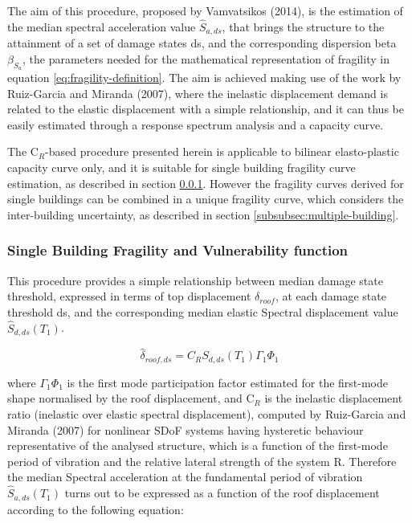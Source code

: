 The aim of this procedure, proposed by Vamvatsikos (2014), is the estimation of the median spectral acceleration value $\hat{S}_{a,ds}$, that brings the structure to the attainment of a set of damage states ds, and the corresponding dispersion beta $\beta_{S_a}$, the parameters needed for the mathematical representation of fragility in equation \ref{eq:fragility-definition}. The aim is achieved making use of the work by Ruiz-Garcia and Miranda (2007), where the inelastic displacement demand is related to the elastic displacement with a simple relationship, and it can thus be easily estimated through a response spectrum analysis and a capacity curve.

The C$_R$-based procedure presented herein is applicable to bilinear elasto-plastic capacity curve only, and it is suitable for single building fragility curve estimation, as described in section \ref{subsubsec:single-building}. However the fragility curves derived for single buildings can be combined in a unique fragility curve, which considers the inter-building uncertainty, as described in section \ref{subsubsec:multiple-building}.

\subsubsection{Single Building Fragility and Vulnerability function}
\label{subsubsec:single-building}
This procedure provides a simple relationship between median damage state threshold, expressed in terms of top displacement $\delta_{roof}$, at each damage state threshold ds, and the corresponding median elastic Spectral displacement value $\hat{S}_{d,ds}(T_1)$.

\begin{equation}
\hat{\delta}_{roof, ds} = C_R S_{d, ds}(T_1) \Gamma_1 \Phi_1
\end{equation}

where $\Gamma_1 \Phi_1$ is the first mode participation factor estimated for the first-mode shape normalised by the roof displacement, and C$_R$ is the inelastic displacement ratio (inelastic over elastic spectral displacement), computed by Ruiz-Garcia and Miranda (2007) for nonlinear SDoF systems having hysteretic behaviour representative of the analysed structure, which is a function of the first-mode period of vibration and the relative lateral strength of the system R. Therefore the median Spectral acceleration at the fundamental period of vibration $\hat{S}_{a,ds}(T_1)$ turns out to be expressed as a function of the roof displacement according to the following equation:

